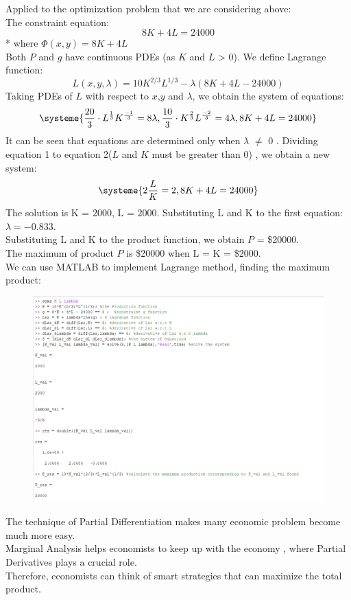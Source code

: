 \documentclass[a4paper]{article}
\begin{document}
Applied to the optimization problem that we are considering above: \\
The constraint equation:
\begin{equation*}
	8K + 4L  = 24000
\end{equation*}*
where $\Phi(x,y) = 8K + 4L$ \\
Both $P$ and $g$ have continuous PDEs (as $K$ and $L$ > 0). We define Lagrange function:
\begin{equation*}
	L(x,y,\lambda) = 10K^{2/3}L^{1/3} - \lambda(8K + 4L -24000)
\end{equation*}
Taking PDEs of $L$ with respect to $x$,$y$ and $\lambda$, we obtain the system of equations:
\[
	\systeme{\frac{20}{3} \cdot L^{\frac{1}{3}} K^{\frac{-1}{3}} = 8\lambda ,\frac{10}{3} \cdot K^{\frac{2}{3}} L^{\frac{-2}{3}}  = 4\lambda , 8K + 4L  = 24000}
\]
It can be seen that equations are determined only when $\lambda$ $\neq$ 0 . Dividing equation 1 to equation 2($L$ and $K$ must be greater than 0) , we obtain a new system:
\[
	\systeme{2\frac{L}{K} = 2, 8K + 4L = 24000}
\]
The solution is K = 2000, L = 2000. Substituting L and K to the first equation: $\lambda = -0.833 $. \\
Substituting L and K to the product function, we obtain $P$ = \$20000. \\
The maximum of product $P$ is \$20000 when L = K = \$2000. \\
We can use MATLAB to implement Lagrange method, finding the maximum product:
\begin{figure}[H]
	\centering
	\includegraphics[width=1\textwidth]{PDE3.png}
\end{figure}
The technique of Partial Differentiation makes many economic problem become much more easy. \\
Marginal Analysis helps economists to keep up with the economy , where Partial Derivatives plays a crucial role. \\ Therefore, economists can think of smart strategies that can maximize the total product.
\newpage
{}
\end{document}

